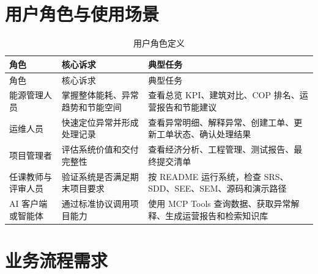 \documentclass[12pt,a4paper]{ctexart}
\begin{document}
\section{用户角色与使用场景}
\begin{longtable}{p{3.2cm}p{4.4cm}p{6.8cm}}
\caption{用户角色定义}\\
\toprule
角色 & 核心诉求 & 典型任务 \\
\midrule
\endfirsthead
\toprule
角色 & 核心诉求 & 典型任务 \\
\midrule
\endhead
能源管理人员 & 掌握整体能耗、异常趋势和节能空间 & 查看总览 KPI、建筑对比、COP 排名、运营报告和节能建议 \\
运维人员 & 快速定位异常并形成处理记录 & 查看异常明细、解释异常、创建工单、更新工单状态、确认处理结果 \\
项目管理者 & 评估系统价值和交付完整性 & 查看经济分析、工程管理、测试报告、最终提交清单 \\
任课教师与评审人员 & 验证系统是否满足期末项目要求 & 按 README 运行系统，检查 SRS、SDD、SEE、SEM、源码和演示路径 \\
AI 客户端或智能体 & 通过标准协议调用项目能力 & 使用 MCP Tools 查询数据、获取异常解释、生成运营报告和检索知识库 \\
\bottomrule
\end{longtable}

\section{业务流程需求}
\end{document}
